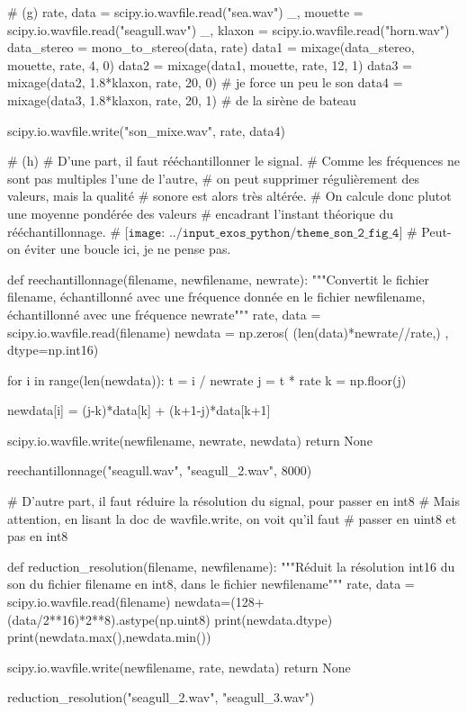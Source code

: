 \documentclass[10pt,fleqn]{article} %
\begin{document}
\begin{corrige}
\begin{python}
# (g)
rate, data = scipy.io.wavfile.read("sea.wav")
_, mouette = scipy.io.wavfile.read("seagull.wav")
_, klaxon = scipy.io.wavfile.read("horn.wav")
data_stereo = mono_to_stereo(data, rate)
data1 = mixage(data_stereo, mouette, rate, 4, 0)
data2 = mixage(data1, mouette, rate, 12, 1)
data3 = mixage(data2, 1.8*klaxon, rate, 20, 0)   # je force un peu le son 
data4 = mixage(data3, 1.8*klaxon, rate, 20, 1)   # de la sirène de bateau

scipy.io.wavfile.write("son_mixe.wav", rate, data4)

# (h)
# D'une part, il faut rééchantillonner le signal.
# Comme les fréquences ne sont pas multiples l'une de l'autre,
# on peut supprimer régulièrement des valeurs, mais la qualité
# sonore est alors très altérée.
# On calcule donc plutot une moyenne pondérée des valeurs
# encadrant l'instant théorique du rééchantillonnage.
# $\texttt{[image: ../input\_exos\_python/theme\_son\_2\_fig\_4]}$
# Peut-on éviter une boucle ici, je ne pense pas. 

def reechantillonnage(filename, newfilename, newrate):
    """Convertit le fichier filename, échantillonné avec une fréquence donnée
    en le fichier newfilename, échantillonné avec une fréquence newrate"""
    rate, data = scipy.io.wavfile.read(filename)
    newdata = np.zeros( (len(data)*newrate//rate,) , dtype=np.int16)

    for i in range(len(newdata)):
        t = i / newrate
        j = t * rate
        k = np.floor(j)

        newdata[i] =  (j-k)*data[k] + (k+1-j)*data[k+1]

    scipy.io.wavfile.write(newfilename, newrate, newdata)
    return None

reechantillonnage("seagull.wav", "seagull_2.wav", 8000)

# D'autre part, il faut réduire la résolution du signal, pour passer en int8
# Mais attention, en lisant la doc de wavfile.write, on voit qu'il faut
# passer en uint8 et pas en int8

def reduction_resolution(filename, newfilename):
    """Réduit la résolution int16 du son du fichier filename
    en int8, dans le fichier newfilename"""
    rate, data = scipy.io.wavfile.read(filename)
    newdata=(128+(data/2**16)*2**8).astype(np.uint8)
    print(newdata.dtype)
    print(newdata.max(),newdata.min())

    scipy.io.wavfile.write(newfilename, rate, newdata)
    return None

reduction_resolution("seagull_2.wav", "seagull_3.wav")

\end{python}
\end{corrige}
\else
\fi
\end{document}
